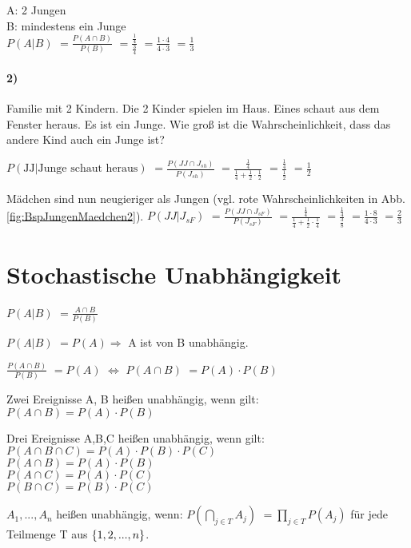 A: 2 Jungen\\
B: mindestens ein Junge\\
$P(A|B)$
$=\frac{P(A\cap B)}{P(B)}$
$=\frac{\frac{1}{4}}{\frac{3}{4}}$
$=\frac{1\cdot 4}{4\cdot 3}$
$=\frac{1}{3}$

\paragraph{2)}
Familie mit 2 Kindern. Die 2 Kinder spielen im Haus. Eines schaut aus dem Fenster heraus. Es ist ein Junge. Wie groß ist die Wahrscheinlichkeit, dass das andere Kind auch ein Junge ist? 

$P(\textrm{JJ} | \textrm{Junge schaut heraus})$
$=\frac{P(JJ \cap J_{sh})}{P(J_{sh})}$
$=\frac{\frac{1}{4}}{\frac{1}{4} + \frac{1}{2} \cdot \frac{1}{2}}$
$=\frac{\frac{1}{4}}{\frac{1}{2}}$
$=\frac{1}{2}$

Mädchen sind nun neugieriger als Jungen (vgl. rote Wahrscheinlichkeiten in Abb. \ref{fig:BspJungenMaedchen2}).
$ P(JJ|J_{sF})$
$=\frac{P(JJ\cap J_{sF})}{P(J_{sF})}$
$=\frac{\frac{1}{4}}{\frac{1}{4} + \frac{1}{2} \cdot \frac{1}{4}}$
$=\frac{\frac{1}{4}}{\frac{3}{8}}$
$=\frac{1\cdot 8}{4 \cdot 3}$
$=\frac{2}{3}$

\section{Stochastische Unabhängigkeit}
$P(A|B)$
$=\frac{A\cap B}{P(B)}$

$P(A|B)$
$=P(A) \Rightarrow$ A ist von B unabhängig. 

$\frac{P(A\cap B)}{P(B)}$
$=P(A) $
$\Leftrightarrow$
$P(A\cap B)$
$=P(A) \cdot P(B)$

\begin{defi}
Zwei Ereignisse A, B heißen unabhängig, wenn gilt: $P(A\cap B) = P(A) \cdot P(B)$
\end{defi}

\begin{defi}
Drei Ereignisse A,B,C heißen unabhängig, wenn gilt: \\
$P(A\cap B\cap C) = P(A) \cdot P(B) \cdot P(C)$\\
$P(A\cap B) = P(A) \cdot P(B)$\\
$P(A\cap C) = P(A) \cdot P(C)$\\
$P(B\cap C) = P(B) \cdot P(C)$
\end{defi}

\begin{defi}
$A_1, ..., A_n$ heißen unabhängig, wenn: 
$P(\bigcap_{j\in T} A_j)$
$=\prod_{j\in T} P(A_j)$
für jede Teilmenge T aus $ \left\lbrace 1,2,...,n \right\rbrace $.
\end{defi}